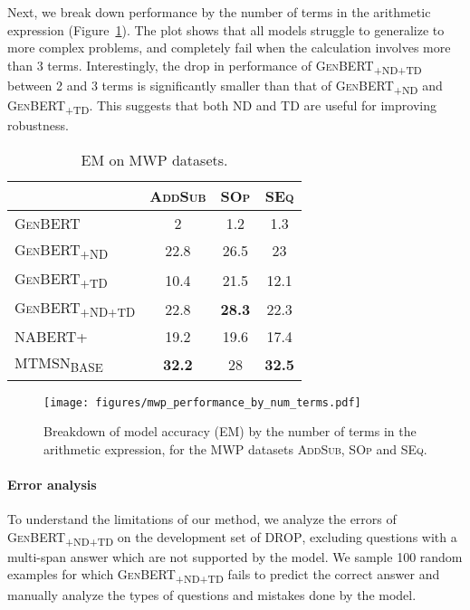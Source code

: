 \documentclass[11pt,a4paper]{article}
\newcommand\ssc[1]{\textsubscript{\textsc{#1}}}
\newcommand\addsub{\textsc{AddSub}}
\newcommand\singleop{\textsc{SOp}}
\newcommand\singleeq{\textsc{SEq}}
\newcommand\nabert{\textsc{NABERT+}}
\newcommand\mtmsn{\textsc{MTMSN}}
\newcommand\drop{\textsc{DROP}}
\begin{document}
Next, we break down performance by the number of terms in the arithmetic expression (Figure~\ref{figure:mwp_performance_by_num_terms}). The plot shows that all models struggle to generalize to more complex problems, and completely fail when the calculation involves more than 3 terms.
Interestingly, the drop in performance of \textsc{GenBERT\ssc{+ND+TD}} between 2 and 3 terms is significantly smaller than that of \textsc{GenBERT\ssc{+ND}} and \textsc{GenBERT\ssc{+TD}}. This suggests that both ND and TD are useful for improving robustness.





\begin{table}[t]\setlength{\belowcaptionskip}{-10pt}
    \footnotesize
    \centering
    \begin{tabular}{l|c|c|c}
          & \addsub & \singleop & \singleeq \\ \hline
         \textsc{GenBERT} & 2 & 1.2 & 1.3 \\
         \textsc{GenBERT\ssc{+ND}} & 22.8 & 26.5 & 23 \\
         \textsc{GenBERT\ssc{+TD}} & 10.4 & 21.5 & 12.1 \\
         \textsc{GenBERT\ssc{+ND+TD}} & 22.8 & \bf 28.3 & 22.3 \\
\hline\hline
         \nabert & 19.2 & 19.6 & 17.4 \\
         \mtmsn \textsubscript{\textsc{BASE}} & \bf 32.2 & 28 & \bf 32.5 \\
    \end{tabular}
    \caption{EM on MWP datasets.}
    \label{table:mwp_performance}
\end{table}

\begin{figure}
\setlength{\abovecaptionskip}{-2pt}
    \centering
    \texttt{[image: figures/mwp\_performance\_by\_num\_terms.pdf]}
    \caption{Breakdown of model accuracy (EM) by the number of terms in the arithmetic expression, for the MWP datasets \addsub{}, \singleop{} and \singleeq{}.}
    \label{figure:mwp_performance_by_num_terms}
\end{figure}

\paragraph{Error analysis}  
To understand the limitations of our method, we analyze the errors of \textsc{GenBERT\ssc{+ND+TD}} on the development set of \drop{}, excluding questions with a multi-span answer which are not supported by the model.
We sample 100 random examples for which \textsc{GenBERT\ssc{+ND+TD}} fails to predict the correct answer and manually analyze the types of questions and mistakes done by the model.
\end{document}
